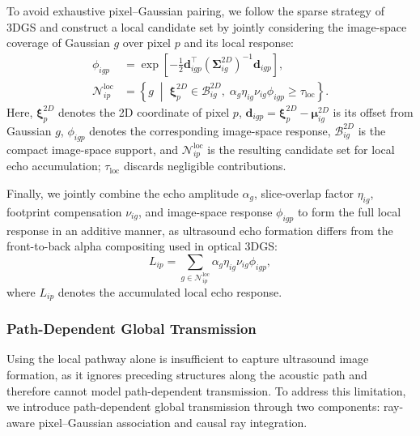 To avoid exhaustive pixel--Gaussian pairing, we follow the sparse
strategy of 3DGS and construct a local candidate set by jointly considering
the image-space coverage of Gaussian $g$ over pixel $p$ and its local response:
\begin{equation}
\begin{aligned}
\phi_{igp}
&=
\exp
\left[
-\frac{1}{2}
\mathbf d_{igp}^{\top}
\left(
\boldsymbol\Sigma^{2D}_{ig}
\right)^{-1}
\mathbf d_{igp}
\right],
\\
\mathcal N^{\mathrm{loc}}_{ip}
&=
\left\{
g
\;\middle|\;
\boldsymbol\xi^{2D}_{p}
\in
\mathcal B^{2D}_{ig},
\;
\alpha_g\eta_{ig}\nu_{ig}\phi_{igp}
\geq
\tau_{\mathrm{loc}}
\right\}.
\end{aligned}
\label{eq:local-candidate-set}
\end{equation}
Here, $\boldsymbol\xi^{2D}_{p}$ denotes the 2D coordinate of pixel $p$,
$\mathbf d_{igp}
=
\boldsymbol\xi^{2D}_{p}
-
\boldsymbol\mu^{2D}_{ig}$
is its offset from Gaussian $g$, $\phi_{igp}$ denotes the corresponding
image-space response, $\mathcal B^{2D}_{ig}$ is the compact image-space
support, and $\mathcal N^{\mathrm{loc}}_{ip}$ is the resulting candidate set
for local echo accumulation; $\tau_{\mathrm{loc}}$ discards negligible
contributions.

Finally, we jointly combine the echo amplitude $\alpha_g$, slice-overlap factor
$\eta_{ig}$, footprint compensation $\nu_{ig}$, and image-space response
$\phi_{igp}$ to form the full local response in an additive manner, as
ultrasound echo formation differs from the front-to-back alpha compositing
used in optical 3DGS:
\begin{equation}
L_{ip}
=
\sum_{g\in\mathcal N^{\mathrm{loc}}_{ip}}
\alpha_g
\eta_{ig}
\nu_{ig}
\phi_{igp},
\label{eq:local-response}
\end{equation}
where $L_{ip}$ denotes the accumulated local echo response.



\subsubsection{Path-Dependent Global Transmission}

Using the local pathway alone is insufficient to capture ultrasound image
formation, as it ignores preceding structures along the acoustic path and
therefore cannot model path-dependent transmission. To address this limitation,
we introduce path-dependent global transmission through two components:
ray-aware pixel--Gaussian association and causal ray integration.

